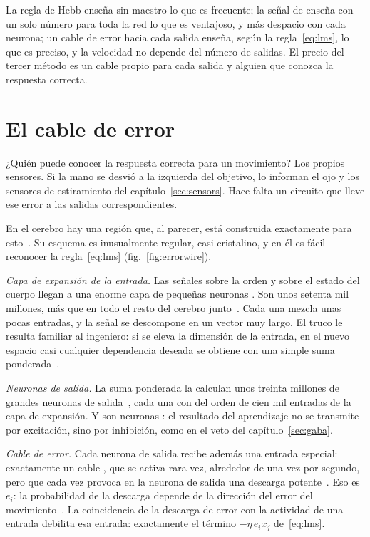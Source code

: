 \begin{keyblock}
\begin{proposition}
\label{prop:teachers}
La regla de Hebb enseña sin maestro lo que es frecuente; la señal de  enseña con un solo número para toda la red lo que es ventajoso, y más despacio con cada neurona; un cable de error hacia cada salida enseña, según la regla~\eqref{eq:lms}, lo que es preciso, y la velocidad no depende del número de salidas. El precio del tercer método es un cable propio para cada salida y alguien que conozca la respuesta correcta.
\end{proposition}
\end{keyblock}

\section{El cable de error}

¿Quién puede conocer la respuesta correcta para un movimiento? Los propios sensores. Si la mano se desvió a la izquierda del objetivo, lo informan el ojo y los sensores de estiramiento del capítulo~\ref{sec:sensors}. Hace falta un circuito que lleve ese error a las salidas correspondientes.

En el cerebro hay una región que, al parecer, está construida exactamente para esto~\cite{Marr1969,Albus1971}. Su esquema es inusualmente regular, casi cristalino, y en él es fácil reconocer la regla~\eqref{eq:lms} (fig.~\ref{fig:errorwire}).

\emph{Capa de expansión de la entrada.} Las señales sobre la orden y sobre el estado del cuerpo llegan a una enorme capa de pequeñas neuronas . Son unos setenta mil millones, más que en todo el resto del cerebro junto~\cite{Azevedo2009}. Cada una mezcla unas pocas entradas, y la señal se descompone en un vector muy largo. El truco le resulta familiar al ingeniero: si se eleva la dimensión de la entrada, en el nuevo espacio casi cualquier dependencia deseada se obtiene con una simple suma ponderada~\cite{Cover1965}.

\emph{Neuronas de salida.} La suma ponderada la calculan unos treinta millones de grandes neuronas de salida~\cite{Andersen1992cereb}, cada una con del orden de cien mil entradas de la capa de expansión. Y son neuronas : el resultado del aprendizaje no se transmite por excitación, sino por inhibición, como en el veto del capítulo~\ref{sec:gaba}.

\emph{Cable de error.} Cada neurona de salida recibe además una entrada especial: exactamente un cable , que se activa rara vez, alrededor de una vez por segundo, pero que cada vez provoca en la neurona de salida una descarga potente~\cite{Ito2001}. Eso es $e_i$: la probabilidad de la descarga depende de la dirección del error del movimiento~\cite{Herzfeld2018}. La coincidencia de la descarga de error con la actividad de una entrada debilita esa entrada: exactamente el término $-\eta\,e_i x_j$ de~\eqref{eq:lms}.


